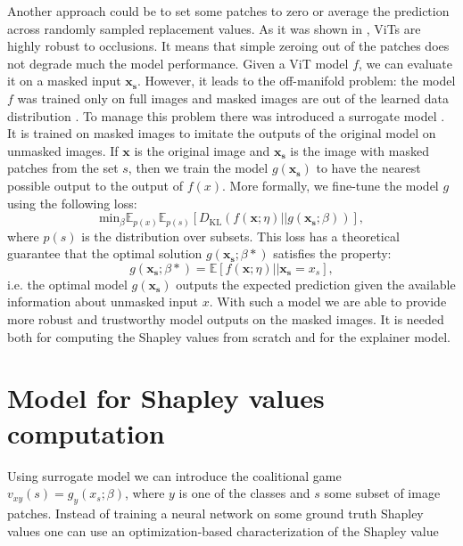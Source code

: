\documentclass[magisterska,en]{pracamgr}
\begin{document}
Another approach could be to set some patches to zero or average the prediction across randomly sampled replacement values. As it was shown in \cite{DBLP:conf/nips/NaseerRKHKY21}, ViTs are highly robust to occlusions. It means that simple zeroing out of the patches does not degrade much the model performance.  Given a ViT model $f$, we can evaluate it on a masked input $\mathbf{x_s}$. However, it leads to the off-manifold problem: the model $f$ was trained only on full images and masked images are out of the learned data distribution \cite{DBLP:conf/aistats/TaufiqBM23}.  To manage this problem there was introduced a surrogate model \cite{DBLP:conf/iclr/FryeMBCSF21}. It is trained on masked images to imitate the outputs of the original model on unmasked images. If $\mathbf{x}$ is the original image and $\mathbf{x_s}$ is the image with masked patches from the set $s$, then we train the model $g(\mathbf{x_s})$ to have the nearest possible output to the output of $f(x)$. More formally, we fine-tune the model $g$ using the following loss:
\begin{equation*}
    \textrm{min}_{\beta} \mathbb{E}_{p(x)} \mathbb{E}_{p(s)} \left[D_{\textrm{KL}} \left(f(\mathbf{x};\eta) || g(\mathbf{x_s};\beta)\right)\right],
\end{equation*}
where $p(s)$ is the distribution over subsets. This loss has a theoretical guarantee that the optimal solution $g(\mathbf{x_s};\beta*)$ satisfies the property:
\begin{equation*}
    g(\mathbf{x_s};\beta*) = \mathbb{E}\left[f(\mathbf{x};\eta) || \mathbf{x_s}=x_s \right],
\end{equation*}
i.e. the optimal model $g(\mathbf{x_s})$ outputs the expected prediction given the available information about unmasked input $x$. With such a model we are able to provide more robust and trustworthy model outputs on the masked images. It is needed both for computing the Shapley values from scratch and for the explainer model.

\section{Model for Shapley values computation}\label{s:model}
Using surrogate model we can introduce the coalitional game $v_{xy}(s) = g_y(x_s;\beta)$, where $y$ is one of the classes and $s$ some subset of image patches. Instead of training a neural network on some ground truth Shapley values one can use an optimization-based characterization of the Shapley value
\end{document}
